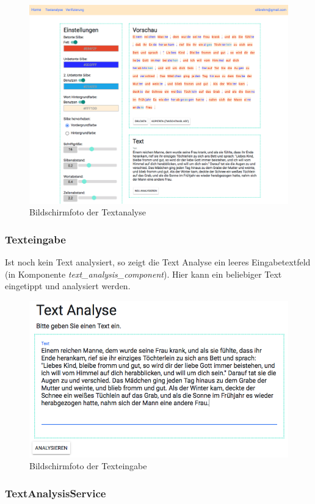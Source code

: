 \begin{figure}[h!]
	\centering
	\includegraphics[width=.8\linewidth, frame]{figures/frontend/textanalyse}
	\caption{Bildschirmfoto der Textanalyse}
	\label{fig:frontend-textanalyse}
\end{figure}

\subsubsection{Texteingabe}

Ist noch kein Text analysiert, so zeigt die Text Analyse ein leeres Eingabetextfeld (in Komponente \textit{text\_analysis\_component}). Hier kann ein beliebiger Text eingetippt und analysiert werden.

\begin{figure}[h!]
	\centering
	\includegraphics[width=.6\linewidth, frame]{figures/frontend/texteingabe}
	\caption{Bildschirmfoto der Texteingabe}
	\label{fig:frontend-texteingabe}
\end{figure}

\subsubsection{TextAnalysisService}

